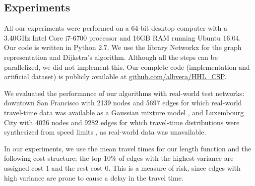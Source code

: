 \documentclass[opre,nonblindrev]{informs3} %
\begin{document}
\subsection{Experiments} \label{sec:exp}
All our experiments were performed on a 64-bit desktop computer with a 3.40GHz Intel Core i7-6700 processor and 16GB RAM running Ubuntu 16.04.
Our code is written in Python 2.7.
We use the library Networkx for the graph representation and Dijkstra's algorithm.
Although all the steps can be parallelized, we did not implement this. Our complete code (implementation and artificial dataset) is publicly available at \url{github.com/albvera/HHL_CSP}.

We evaluated the performance of our algorithms with real-world test networks: downtown San Francisco with 2139 nodes and 5697 edges for which real-world travel-time data was available as a Gaussian mixture model \cite{sf_data}, and Luxembourg City with 4026 nodes and 9282 edges for which travel-time distributions were synthesized from speed limits \cite{niknami2016tractable}, as real-world data was unavailable.
 
In our experiments, we use the mean travel times for our length function and the following cost structure; the top 10\% of edges with the highest variance are assigned cost 1 and the rest cost 0.
This is a measure of risk, since edges with high variance are prone to cause a delay in the travel time.
\end{document}
